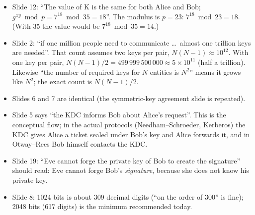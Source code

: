 \begin{fixbox}
\begin{itemize}[nosep]
  \item Slide 12: ``The value of K is the same for both Alice and Bob; $g^{xy} \bmod p = 7^{18} \bmod 35 = 18$''. The modulus is $p = 23$: $7^{18} \bmod 23 = 18$. (With 35 the value would be $7^{18} \bmod 35 = 14$.)
  \item Slide 2: ``if one million people need to communicate \dots\ almost one trillion keys are needed''. That count assumes two keys per pair, $N(N-1) \approx 10^{12}$. With one key per pair, $N(N-1)/2 = 499\,999\,500\,000 \approx 5 \times 10^{11}$ (half a trillion). Likewise ``the number of required keys for $N$ entities is $N^2$'' means it grows like $N^2$; the exact count is $N(N-1)/2$.
  \item Slides 6 and 7 are identical (the symmetric-key agreement slide is repeated).
  \item Slide 5 says ``the KDC informs Bob about Alice's request''. This is the conceptual flow; in the actual protocols (Needham--Schroeder, Kerberos) the KDC gives Alice a ticket sealed under Bob's key and Alice forwards it, and in Otway--Rees Bob himself contacts the KDC.
  \item Slide 19: ``Eve cannot forge the private key of Bob to create the signature'' should read: Eve cannot forge Bob's \emph{signature}, because she does not know his private key.
  \item Slide 8: 1024 bits is about 309 decimal digits (``on the order of 300'' is fine); 2048 bits (617 digits) is the minimum recommended today.
\end{itemize}
\end{fixbox}
